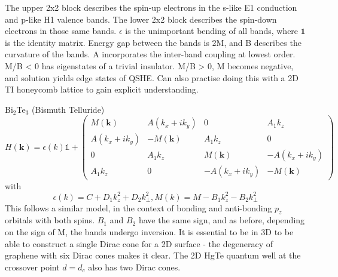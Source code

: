 \documentclass{article} %
\newcommand{\bismuthtelluride}[1]{Bi$_2$Te$_3$#1}
\begin{document}
\begin{outline}
				\4 The upper 2x2 block describes the spin-up electrons in the s-like E1 conduction and p-like H1 valence bands.
				The lower 2x2 block describes the spin-down electrons in those same bands.
				\4 $\epsilon$ is the unimportant bending of all bands, where $\mathds{1}$ is the identity matrix.
				\4 Energy gap between the bands is 2M, and B describes the curvature of the bands. 
				\4 A incorporates the inter-band coupling at lowest order.
				\4 M/B < 0 has eigenstates of a trivial insulator.
				\4 M/B > 0, M becomes negative, and solution yields edge states of QSHE.
				\4 Can also practise doing this with a 2D TI honeycomb lattice to gain explicit understanding. \cite{kane_quantum_2005,kane_z_2005}
				
			 	\3 \bismuthtelluride{} (Bismuth Telluride) 
				\begin{equation}
					H(\textbf{k}) = \epsilon(k)\mathds{1} + \left(
						\begin{matrix}
						M(\textbf{k}) & A(k_x+ik_y) & 0 & A_1k_z\\
						A(k_x+ik_y) & -M(\textbf{k}) & A_1k_z & 0\\
						0 & A_1k_z & M(\textbf{k}) & -A(k_x+ik_y)\\
						A_1k_z & 0 & -A(k_x+ik_y) & -M(\textbf{k})
						\end{matrix}
					\right)
				\end{equation}
				with \begin{equation}
					\epsilon(k)=C+D_1k_z^2 + D_2k_\perp^2, M(k) = M - B_1k_z^2 - B_2k_\perp^2
				\end{equation}
				 	\4 This follows a similar model, in the context of bonding and anti-bonding $p_z$ orbitals with both spins. $B_1$ and $B_2$ have the same sign, and as before, depending on the sign of M, the bands undergo inversion.
				\2 It is essential to be in 3D to be able to construct a single Dirac cone for a 2D surface - the degeneracy of graphene with six Dirac cones makes it clear. The 2D HgTe quantum well at the crossover point $d=d_c$ also has two Dirac cones.  
		\end{outline}
	
\end{document}
